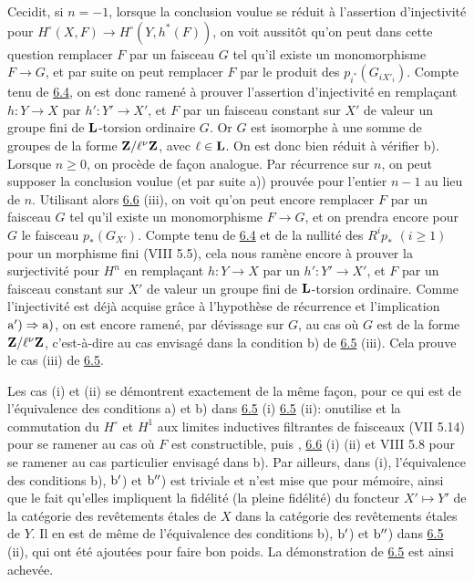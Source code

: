 \documentclass[10pt]{../fichiers-configuration-latex/smfart}
\begin{document}
Ceci\pageoriginale dit, si $n=-1$, \ie lorsque la conclusion voulue se
réduit à l'assertion d'injectivité pour $H^{\circ}(X,F)\rightarrow
H^{\circ}(Y,h^{\ast}(F))$, on voit aussitôt qu'on peut dans cette
question remplacer $F$ par un faisceau $G$ tel qu'il existe un
monomorphisme $F\rightarrow G$, et par suite on peut remplacer $F$ par
le produit des $p_{i^{\ast}}(G_{i X'_i})$. Compte tenu de \hyperref[XII.lem6.4]{6.4}, on est
donc ramené à prouver l'assertion d'injectivité en remplaçant
$h:Y\rightarrow X$ par $h':Y'\rightarrow X'$, et $F$ par un faisceau
constant sur $X'$ de valeur un groupe fini de $\mathbf{L}$-torsion
ordinaire $G$. Or $G$ est isomorphe à une somme de groupes de la forme
$\mathbf{Z}/\ell^{\nu}\mathbf{Z}$, avec $\ell\in \mathbf{L}$. On est
donc bien réduit à vérifier b). Lorsque $n\geq 0$, on procède de fa\c
con analogue. Par récurrence sur $n$, on peut supposer la conclusion
voulue (et par suite a)) prouvée pour l'entier $n-1$ au lieu de
$n$. Utilisant alors \hyperref[XII.cor6.6]{6.6} (iii), on voit qu'on peut encore remplacer
$F$ par un faisceau $G$ tel qu'il existe un monomorphisme
$F\rightarrow G$, et on prendra encore pour $G$ le faisceau
$p_{\ast}(G_{X'})$. Compte tenu de \hyperref[XII.lem6.4]{6.4} et de la nullité des
$R^{i}p_{\ast}$ $(i\geq 1)$ pour un morphisme fini (VIII 5.5), cela
nous ramène encore à prouver la surjectivité pour $H^n$ en rempla\c
cant $h:Y\rightarrow X$ par un $h':Y'\rightarrow X'$, et $F$ par un
faisceau constant sur $X'$ de valeur un groupe fini de
$\mathbf{L}$-torsion ordinaire. Comme l'injectivité est déjà acquise
grâce à l'hypothèse de récurrence et l'implication ${\rm
a')\Rightarrow a)}$, on est encore ramené, par dévissage sur $G$, au
cas où $G$ est de la forme $\mathbf{Z}/\ell^{\nu}\mathbf{Z}$,
c'est-à-dire au cas envisagé dans la condition b) de \hyperref[XII.prop6.5]{6.5} (iii). Cela
prouve le cas (iii) de \hyperref[XII.prop6.5]{6.5}.

Les cas (i) et (ii) se démontrent exactement de la même façon, pour
ce qui est de l'équivalence des conditions a) et b) dans
\hyperref[XII.prop6.5]{6.5} (i) \resp 
\hyperref[XII.prop6.5]{6.5} (ii): on\pageoriginale utilise  et
la commutation du 
$H^{\circ}$ et $H^1$ aux limites inductives filtrantes de faisceaux
(VII 5.14) pour se ramener au cas où $F$ est constructible, puis 
, \hyperref[XII.cor6.6]{6.6} (i) (ii) et VIII 5.8 pour 
se ramener au cas particulier
envisagé dans b). Par ailleurs, dans (i), l'équivalence des conditions
b), ${\rm b'}$) et ${\rm b''}$) est triviale et n'est mise que pour
mémoire, ainsi que le fait qu'elles impliquent la fidélité (\resp la
pleine fidélité) du foncteur $X'\mapsto Y'$ de la catégorie des
revêtements étales de $X$ dans la catégorie des revêtements étales de
$Y$. Il en est de même de l'équivalence des conditions b), ${\rm b'}$)
et ${\rm b''}$) dans \hyperref[XII.prop6.5]{6.5} (ii), qui ont été ajoutées pour
faire bon 
poids. La démonstration de \hyperref[XII.prop6.5]{6.5} est ainsi achevée.
\end{document}
